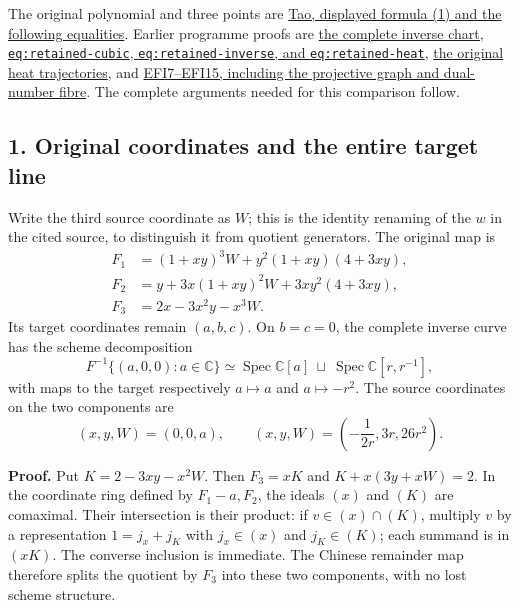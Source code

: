 \documentclass[
  10pt,
  a4paper,
]{article}
\begin{document}
The original polynomial and three points are
\href{https://terrytao.wordpress.com/2026/07/21/a-digestion-of-the-jacobian-conjecture-counterexample/}{Tao,
displayed formula (1) and the following equalities}. Earlier programme
proofs are
\href{https://github.com/KokunoYumeto/zeta-function-research-reader/blob/ac168d55cbb400a6c8926a00d67909ba65646ac5/satellites/23_source_mechanism_transfer.tex\#L45}{the
complete inverse chart, \texttt{eq:\allowbreak{}retained-\allowbreak{}cubic},
\texttt{eq:\allowbreak{}retained-\allowbreak{}inverse}, and \texttt{eq:\allowbreak{}retained-\allowbreak{}heat}},
\href{https://github.com/KokunoYumeto/zeta-function-research-reader/blob/ac168d55cbb400a6c8926a00d67909ba65646ac5/satellites/26_incompressible_fibre_heat.tex\#L389}{the
original heat trajectories}, and
\href{https://github.com/KokunoYumeto/zeta-function-research-reader/blob/173dbc6ed5a03235dbe7654f928f3692107db39b/workbenches/splitzero-tandem/branches/tau-zero-prime-positivity/ESCAPING_FIBRE_INFINITESIMAL_DERIVATION.md\#L89}{EFI7--EFI15,
including the projective graph and dual-number fibre}. The complete
arguments needed for this comparison follow.

\subsection{1. Original coordinates and the entire target
line}\label{original-coordinates-and-the-entire-target-line}

Write the third source coordinate as \(W\); this is the identity
renaming of the \(w\) in the cited source, to distinguish it from
quotient generators. The original map is \[
\begin{aligned}
F_1&=(1+xy)^3W+y^2(1+xy)(4+3xy),\\
F_2&=y+3x(1+xy)^2W+3xy^2(4+3xy),\\
F_3&=2x-3x^2y-x^3W.
\end{aligned}\tag{HEB1}
\] Its target coordinates remain \((a,b,c)\). On \(b=c=0\), the complete
inverse curve has the scheme decomposition \[
F^{-1}\{(a,0,0):a\in\mathbb C\}
\simeq\operatorname{Spec}\mathbb C[a]\ \sqcup\ 
\operatorname{Spec}\mathbb C[r,r^{-1}],
\tag{HEB2}
\] with maps to the target respectively \(a\mapsto a\) and
\(a\mapsto-r^2\). The source coordinates on the two components are \[
(x,y,W)=(0,0,a),\qquad
(x,y,W)=\left(-\frac1{2r},3r,26r^2\right).
\tag{HEB3}
\]

\textbf{Proof.} Put \(K=2-3xy-x^2W\). Then \(F_3=xK\) and
\(K+x(3y+xW)=2\). In the coordinate ring defined by \(F_1-a,F_2\), the
ideals \((x)\) and \((K)\) are comaximal. Their intersection is their
product: if \(v\in(x)\cap(K)\), multiply \(v\) by a representation
\(1=j_x+j_K\) with \(j_x\in(x)\) and \(j_K\in(K)\); each summand is in
\((xK)\). The converse inclusion is immediate. The Chinese remainder map
therefore splits the quotient by \(F_3\) into these two components, with
no lost scheme structure.
\end{document}
